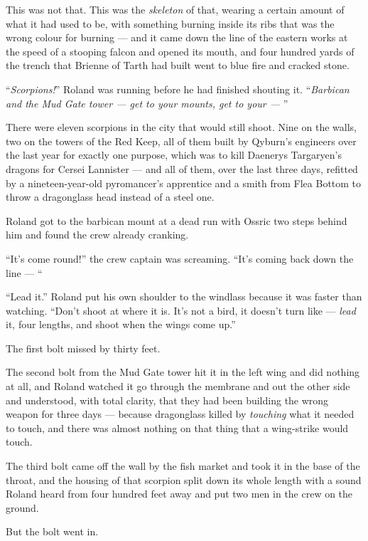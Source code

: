 This was not that. This was the \textit{skeleton} of that, wearing a certain amount of what it had used to be, with something burning inside its ribs that was the wrong colour for burning — and it came down the line of the eastern works at the speed of a stooping falcon and opened its mouth, and four hundred yards of the trench that Brienne of Tarth had built went to blue fire and cracked stone.

“\textit{Scorpions!}” Roland was running before he had finished shouting it. “\textit{Barbican and the Mud Gate tower — get to your mounts, get to your — }”

\sceneBreak

There were eleven scorpions in the city that would still shoot. Nine on the walls, two on the towers of the Red Keep, all of them built by Qyburn’s engineers over the last year for exactly one purpose, which was to kill Daenerys Targaryen’s dragons for Cersei Lannister — and all of them, over the last three days, refitted by a nineteen-year-old pyromancer’s apprentice and a smith from Flea Bottom to throw a dragonglass head instead of a steel one.

Roland got to the barbican mount at a dead run with Ossric two steps behind him and found the crew already cranking.

“It’s come round!” the crew captain was screaming. “It’s coming back down the line — “

“Lead it.” Roland put his own shoulder to the windlass because it was faster than watching. “Don’t shoot at where it is. It’s not a bird, it doesn’t turn like — \textit{lead} it, four lengths, and shoot when the wings come up.”

The first bolt missed by thirty feet.

The second bolt from the Mud Gate tower hit it in the left wing and did nothing at all, and Roland watched it go through the membrane and out the other side and understood, with total clarity, that they had been building the wrong weapon for three days — because dragonglass killed by \textit{touching} what it needed to touch, and there was almost nothing on that thing that a wing-strike would touch.

The third bolt came off the wall by the fish market and took it in the base of the throat, and the housing of that scorpion split down its whole length with a sound Roland heard from four hundred feet away and put two men in the crew on the ground.

But the bolt went in.

